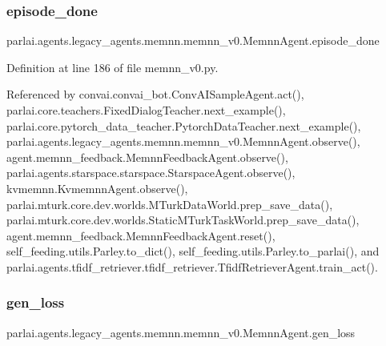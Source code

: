 \subsubsection{\texorpdfstring{episode\+\_\+done}{episode\_done}}
{\footnotesize\ttfamily parlai.\+agents.\+legacy\+\_\+agents.\+memnn.\+memnn\+\_\+v0.\+Memnn\+Agent.\+episode\+\_\+done}



Definition at line 186 of file memnn\+\_\+v0.\+py.



Referenced by convai.\+convai\+\_\+bot.\+Conv\+A\+I\+Sample\+Agent.\+act(), parlai.\+core.\+teachers.\+Fixed\+Dialog\+Teacher.\+next\+\_\+example(), parlai.\+core.\+pytorch\+\_\+data\+\_\+teacher.\+Pytorch\+Data\+Teacher.\+next\+\_\+example(), parlai.\+agents.\+legacy\+\_\+agents.\+memnn.\+memnn\+\_\+v0.\+Memnn\+Agent.\+observe(), agent.\+memnn\+\_\+feedback.\+Memnn\+Feedback\+Agent.\+observe(), parlai.\+agents.\+starspace.\+starspace.\+Starspace\+Agent.\+observe(), kvmemnn.\+Kvmemnn\+Agent.\+observe(), parlai.\+mturk.\+core.\+dev.\+worlds.\+M\+Turk\+Data\+World.\+prep\+\_\+save\+\_\+data(), parlai.\+mturk.\+core.\+dev.\+worlds.\+Static\+M\+Turk\+Task\+World.\+prep\+\_\+save\+\_\+data(), agent.\+memnn\+\_\+feedback.\+Memnn\+Feedback\+Agent.\+reset(), self\+\_\+feeding.\+utils.\+Parley.\+to\+\_\+dict(), self\+\_\+feeding.\+utils.\+Parley.\+to\+\_\+parlai(), and parlai.\+agents.\+tfidf\+\_\+retriever.\+tfidf\+\_\+retriever.\+Tfidf\+Retriever\+Agent.\+train\+\_\+act().

\mbox{\label{classparlai_1_1agents_1_1legacy__agents_1_1memnn_1_1memnn__v0_1_1MemnnAgent_a1679d276474a4ab8baa4d368fdee8c8b}} 
\subsubsection{\texorpdfstring{gen\+\_\+loss}{gen\_loss}}
{\footnotesize\ttfamily parlai.\+agents.\+legacy\+\_\+agents.\+memnn.\+memnn\+\_\+v0.\+Memnn\+Agent.\+gen\+\_\+loss}



